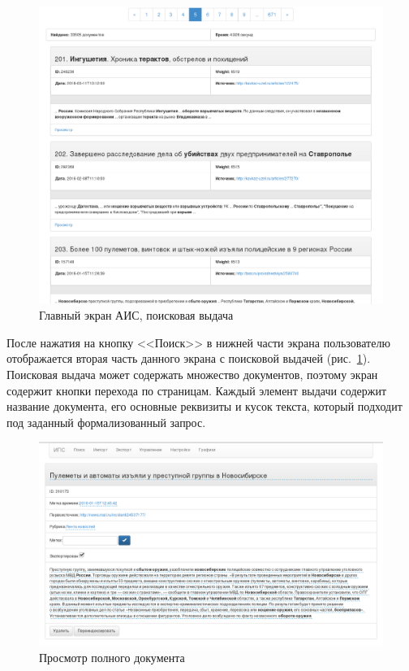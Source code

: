 \begin{figure}[h!]
\centering
\includegraphics[width=0.9\linewidth]{technology/gui_main_results}
\caption{Главный экран АИС, поисковая выдача}
\label{figure:guiMainResults}
\end{figure}

После нажатия на кнопку <<Поиск>> в нижней части экрана пользователю отображается вторая часть данного экрана с поисковой выдачей (рис.~\ref{figure:guiMainResults}). Поисковая выдача может содержать множество документов, поэтому экран содержит кнопки перехода по страницам. Каждый элемент выдачи содержит название документа, его основные реквизиты и кусок текста, который подходит под заданный формализованный запрос. 

\begin{figure}[h!]
\centering
\includegraphics[width=0.9\linewidth]{technology/gui_main_document}
\caption{Просмотр полного документа}
\label{figure:guiMainDocument}
\end{figure}

